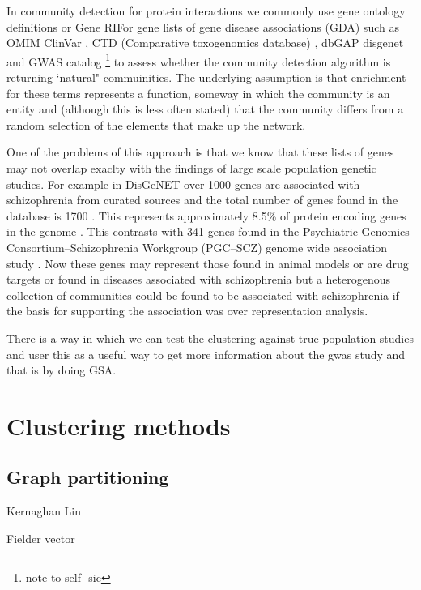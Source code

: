 In community detection for protein interactions we commonly use gene ontology definitions or Gene RIFor gene lists of gene disease associations (GDA) such as OMIM \cite{hamosh2005online} ClinVar \cite{landrum2016clinvar}, CTD (Comparative toxogenomics database) \cite{davis2019comparative}, dbGAP \cite{tryka2014ncbi} disgenet \cite{pinero2020disgenet} \cite{pinero2016disgenet} and GWAS catalog \footnote{note to self -sic} \cite{welter2014nhgri} to assess whether the community detection algorithm is returning `natural" commuinities. The underlying assumption is that enrichment for these terms represents a function, someway in which the community is an entity and (although this is less often stated) that the community differs from a random selection of the elements that make up the network. 

One of the problems of this approach is that we know that these lists of genes may not overlap exaclty with the findings of large scale population genetic studies. For example in DisGeNET over 1000 genes are associated with schizophrenia from curated sources and the total number of genes found in the database is 1700 \cite{pinero2020disgenet}. This represents approximately 8.5\% of protein encoding genes in the genome \cite{ezkurdia2014multiple}. This 
contrasts with 341 genes found in the Psychiatric Genomics Consortium–Schizophrenia Workgroup (PGC–SCZ) genome wide association study \cite{ripke2014biological}. Now these genes may represent those found in animal models or are drug targets or found in diseases associated with schizophrenia but a heterogenous collection of communities could be found to be associated with schizophrenia if the basis for supporting the association was over representation analysis. 


There is a way in which we can test the clustering against true population studies and user this as a useful way to get more information about the gwas study and that is by doing GSA.


\section{Clustering methods}

\subsection{Graph partitioning}
Kernaghan Lin

Fielder vector

